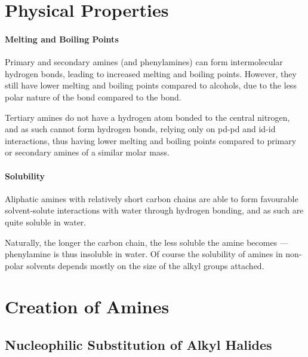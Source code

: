



	\section{Physical Properties}

		\paragraph{Melting and Boiling Points}

		Primary and secondary amines (and phenylamines) can form intermolecular hydrogen bonds, leading to increased melting and boiling points.
		However, they still have lower melting and boiling points compared to alcohols, due to the less polar nature of the  bond compared
		to the  bond.

		Tertiary amines do not have a hydrogen atom bonded to the central nitrogen, and as such cannot form hydrogen bonds, relying only on pd-pd
		and id-id interactions, thus having lower melting and boiling points compared to primary or secondary amines of a similar molar mass.


		\paragraph{Solubility}

		Aliphatic amines with relatively short carbon chains are able to form favourable solvent-solute interactions with water through hydrogen
		bonding, and as such are quite soluble in water.

		Naturally, the longer the carbon chain, the less soluble the amine becomes --- phenylamine is thus insoluble in water. Of course the
		solubility of amines in non-polar solvents depends mostly on the size of the alkyl groups attached.




	\pagebreak
	\section{Creation of Amines}

		\subsection{Nucleophilic Substitution of Alkyl Halides}

